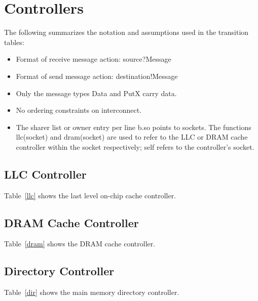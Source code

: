 \section{Controllers}

The following summarizes the notation and assumptions used in the transition
tables:
\begin{itemize}
  \item Format of receive message action: \textsf{source?Message}
  \item Format of send message action: \textsf{destination!Message}
  \item Only the message types \textsf{Data} and \textsf{PutX} carry data.
  \item No ordering constraints on interconnect.
  \item The sharer list or owner entry per line \textsf{b.so} points to
    sockets. The functions \textsf{llc(socket)} and \textsf{dram(socket}) are
    used to refer to the LLC or DRAM cache controller within the socket
    respectively; \textsf{self} refers to the controller's socket.
\end{itemize}

\subsection{LLC Controller}

Table~\ref{llc} shows the last level on-chip cache controller.

\subsection{DRAM Cache Controller}

Table~\ref{dram} shows the DRAM cache controller.

\subsection{Directory Controller}

Table~\ref{dir} shows the main memory directory controller.
